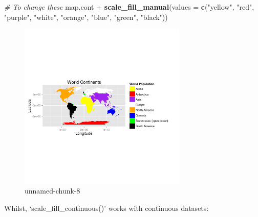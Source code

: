 \documentclass[]{article}
\newenvironment{Shaded}{}{}
\newcommand{\KeywordTok}[1]{\textcolor[rgb]{0.00,0.44,0.13}{\textbf{{#1}}}}
\newcommand{\DataTypeTok}[1]{\textcolor[rgb]{0.56,0.13,0.00}{{#1}}}
\newcommand{\StringTok}[1]{\textcolor[rgb]{0.25,0.44,0.63}{{#1}}}
\newcommand{\CommentTok}[1]{\textcolor[rgb]{0.38,0.63,0.69}{\textit{{#1}}}}
\newcommand{\NormalTok}[1]{{#1}}
\let\Oldincludegraphics\includegraphics
\renewcommand{\includegraphics}[1]{\Oldincludegraphics[width=8cm]{#1}}
\begin{document}
\begin{Shaded}
\begin{Highlighting}[]

\CommentTok{# To change these}
\NormalTok{map.cont + }\KeywordTok{scale_fill_manual}\NormalTok{(}\DataTypeTok{values =} \KeywordTok{c}\NormalTok{(}\StringTok{"yellow"}\NormalTok{, }\StringTok{"red"}\NormalTok{, }\StringTok{"purple"}\NormalTok{, }\StringTok{"white"}\NormalTok{, }
    \StringTok{"orange"}\NormalTok{, }\StringTok{"blue"}\NormalTok{, }\StringTok{"green"}\NormalTok{, }\StringTok{"black"}\NormalTok{))}
\end{Highlighting}
\end{Shaded}
\begin{figure}[htbp]
\centering
\includegraphics{figure/unnamed-chunk-82.png}
\caption{unnamed-chunk-8}
\end{figure}

Whilst, `scale\_fill\_continuous()' works with continuous datasets:
\end{document}

